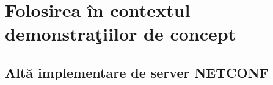 \section{Folosirea în contextul demonstraţiilor de concept}

\subsection{Altă implementare de server NETCONF}